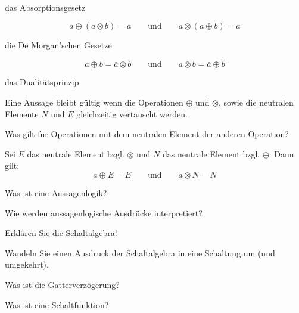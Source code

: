 \documentclass
[
  draft    = true,
  fontsize = 11pt,
  parskip  = half-,
  BCOR     = 0pt,
  DIV      = 11,
  ngerman,
  dvipsnames
]
{scrartcl}
\begin{document}
\begin{mytemize}
\begin{mytemize}
\begin{evelyn}
            \end{evelyn}
          \item das Absorptionsgesetz
            \begin{evelyn}
                \begin{equation*}
                    a\oplus(a\otimes b)=a
                    \qquad\text{und}\qquad
                    a\otimes(a\oplus b)=a
                \end{equation*}
            \end{evelyn}
          \item die De Morgan'schen Gesetze
            \begin{evelyn}
                \begin{equation*}
                    \overline{a\oplus b}=\bar{a}\otimes\bar{b}
                    \qquad\text{und}\qquad
                    \overline{a\otimes b}=\bar{a}\oplus\bar{b}
                \end{equation*}
            \end{evelyn}
          \item das Dualitätsprinzip
            \begin{evelyn}
                Eine Aussage bleibt gültig wenn die Operationen $\oplus$ und $\otimes$, sowie die neutralen Elemente $N$ und $E$ gleichzeitig vertauscht werden.
            \end{evelyn}
        \end{mytemize}
  \item Was gilt für Operationen mit dem neutralen Element der anderen Operation?
        \begin{evelyn}
            Sei $E$ das neutrale Element bzgl. $\otimes$ und $N$ das neutrale Element bzgl. $\oplus$. Dann gilt:
                \begin{equation*}
                    a\oplus E=E
                    \qquad\text{und}\qquad
                    a\otimes N=N
                \end{equation*}
        \end{evelyn}
  \item Was ist eine Aussagenlogik?
  \item Wie werden aussagenlogische Ausdrücke interpretiert?
  \item Erklären Sie die Schaltalgebra!
  \item Wandeln Sie einen Ausdruck der Schaltalgebra in eine Schaltung um (und umgekehrt).
  \item Was ist die Gatterverzögerung?
  \item Was ist eine Schaltfunktion?

\end{mytemize}
\end{document}
